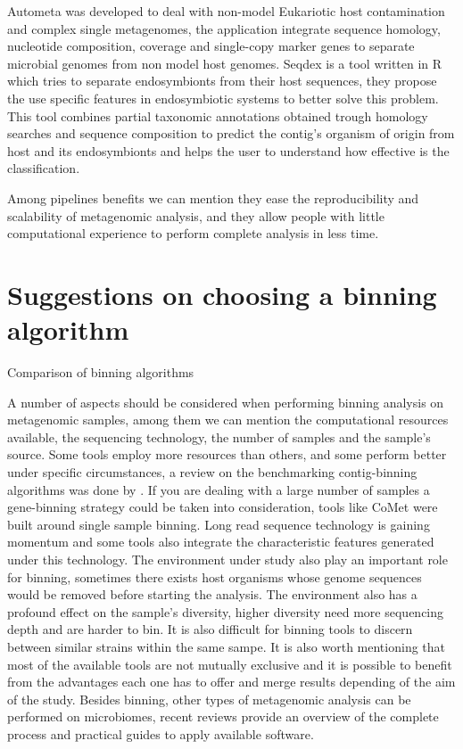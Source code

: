 \documentclass{article}
\begin{document}
Autometa was developed to deal with non-model Eukariotic host contamination and complex single metagenomes, the application integrate sequence homology, nucleotide composition, coverage and single-copy marker genes to separate microbial genomes from non model host genomes. 
Seqdex is a tool written in R which tries to separate endosymbionts from their host sequences, they propose the use specific features in endosymbiotic systems to better solve this problem. This tool combines partial taxonomic annotations obtained trough homology searches and sequence composition to predict the contig's organism of origin from host and its endosymbionts and helps the user to understand how effective is the classification.

Among pipelines benefits we can mention they ease the reproducibility and scalability of metagenomic analysis, and they allow people with little computational experience to perform complete analysis in less time.

\section{Suggestions on choosing a binning algorithm}
\begin{table}
\begin{tiny}
\centering
\caption[Comparison of binning algorithms]{Comparison of binning algorithms}
	
\label{Tbinningsoftware}
\end{tiny}
\end{table}
A number of aspects should be considered when performing binning analysis on metagenomic samples, among them we can mention the computational resources available, the sequencing technology, the number of samples and the sample's source.
Some tools employ more resources than others, and some perform better under specific circumstances, a review on the benchmarking contig-binning algorithms was done by .
If you are dealing with a large number of samples a gene-binning strategy could be taken into consideration, tools like CoMet were built around single sample binning. Long read sequence technology is gaining momentum and some tools also integrate the characteristic features generated under this technology.
The environment under study also play an important role for binning, sometimes there exists host organisms whose genome sequences would be removed before starting the analysis. The environment also has a profound effect on the sample's diversity, higher diversity need more sequencing depth and are harder to bin. It is also difficult for binning tools to discern between similar strains within the same sampe.  
It is also worth mentioning that most of the available tools are not mutually exclusive and it is possible to benefit from the advantages each one has to offer and merge results depending of the aim of the study.
Besides binning, other types of metagenomic analysis can be performed on microbiomes, recent reviews provide an overview of the complete process and practical guides to apply available software.  
\end{document}
